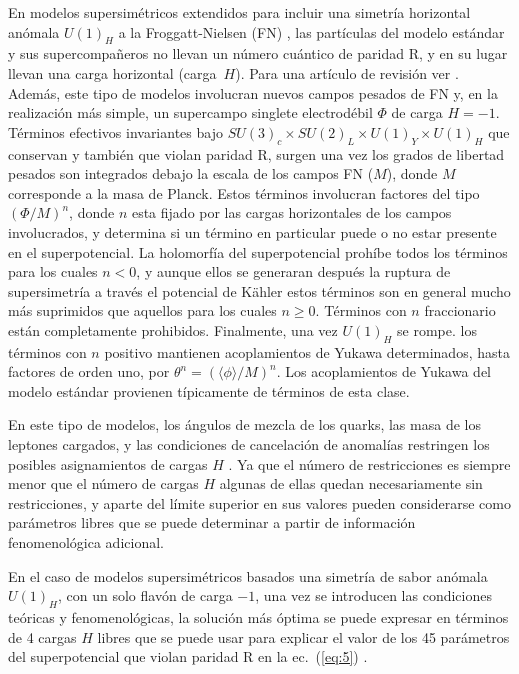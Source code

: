 En modelos supersimétricos extendidos para incluir una simetría
horizontal anómala $U(1)_H$ a la Froggatt-Nielsen (FN)
\cite{Froggatt:1978nt}, las partículas del modelo estándar y sus
supercompañeros no llevan un número cuántico de paridad R, y en su
lugar llevan una carga horizontal (carga~$H$). Para una artículo de
revisión ver \cite{Dreiner:2003hw}.  Además, este tipo de modelos
involucran nuevos campos pesados de FN y, en la realización más
simple, un supercampo singlete electrodébil $\Phi$ de carga
$H=-1$. Términos efectivos invariantes bajo $SU(3)_c\times
SU(2)_L\times U(1)_Y\times U(1)_H$ que conservan y también que violan
paridad R, surgen una vez los grados de libertad pesados son
integrados debajo la escala de los campos FN ($M$), donde $M$
corresponde a la masa de Planck. Estos términos involucran factores
del tipo $(\Phi/M)^n$, donde $n$ esta fijado por las cargas
horizontales de los campos involucrados, y determina si un término en
particular puede o no estar presente en el superpotencial. La
holomorfía del superpotencial prohíbe todos los términos para los
cuales $n<0$, y aunque ellos se generaran después la ruptura de
supersimetría a través el potencial de K\"ahler \cite{Giudice:1988yz}
estos términos son en general mucho más suprimidos que aquellos para
los cuales $n\ge0$.  Términos con $n$ fraccionario están completamente
prohibidos. Finalmente, una vez $U(1)_H$ se rompe. los términos con $n$
positivo mantienen acoplamientos de Yukawa determinados, hasta
factores de orden uno, por $\theta^n=(\langle\phi\rangle/M)^n$. Los
acoplamientos de Yukawa del modelo estándar provienen típicamente de
términos de esta clase.

En este tipo de modelos, los ángulos de mezcla de los quarks, las masa
de los leptones cargados, y las condiciones de cancelación de
anomalías restringen los posibles asignamientos de cargas $H$
\cite{Leurer:1992wg,Binetruy:1996xk}. Ya que el número de
restricciones es siempre menor que el número de cargas $H$ algunas de
ellas quedan necesariamente sin restricciones, y aparte del límite
superior en sus valores pueden considerarse como parámetros libres que
se puede determinar a partir de información fenomenológica
adicional. 


En el caso de modelos supersimétricos basados una simetría de sabor
anómala $U(1)_H$, con un solo flavón de carga $-1$, una vez se
introducen las condiciones teóricas y fenomenológicas, la solución más
óptima se puede expresar en términos de 4 cargas $H$ libres que se
puede usar para explicar el valor de los 45 parámetros del
superpotencial que violan paridad R en la ec.~(\ref{eq:5})
\cite{Mira:2000gg,Dreiner:2003hw,Dreiner:2003yr,Dreiner:2007vp,Dreiner:2006xw,Sierra:2009zq}.


